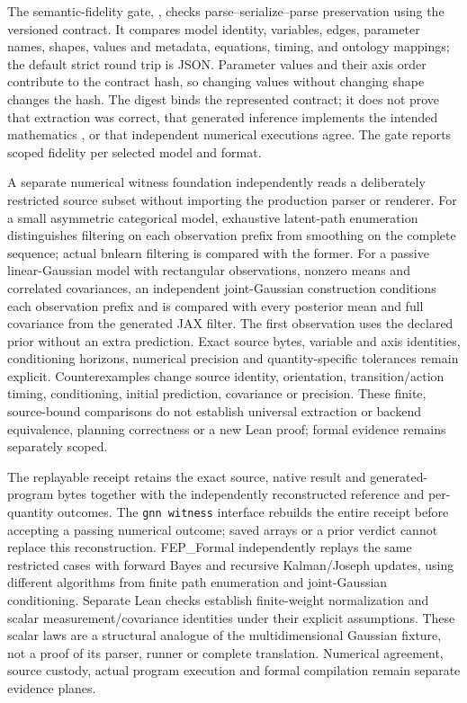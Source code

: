 \documentclass[
  english,
  9pt,
]{extarticle}
\begin{document}
The semantic-fidelity gate,
, checks
parse--serialize--parse preservation using the versioned
 contract. It compares model
identity, variables, edges, parameter names, shapes, values and
metadata, equations, timing, and ontology mappings; the default strict
round trip is JSON. Parameter values and their axis order contribute to
the contract hash, so changing values without changing shape changes the
hash. The digest binds the represented contract; it does not prove that
extraction was correct, that generated inference implements the intended
mathematics \citep{dacosta2020}, or that independent numerical
executions agree. The gate reports scoped fidelity per selected model
and format.

A separate numerical witness foundation independently reads a
deliberately restricted source subset without importing the production
parser or renderer. For a small asymmetric categorical model, exhaustive
latent-path enumeration distinguishes filtering on each observation
prefix from smoothing on the complete sequence; actual bnlearn filtering
is compared with the former. For a passive linear-Gaussian model with
rectangular observations, nonzero means and correlated covariances, an
independent joint-Gaussian construction conditions each observation
prefix and is compared with every posterior mean and full covariance
from the generated JAX filter. The first observation uses the declared
prior without an extra prediction. Exact source bytes, variable and axis
identities, conditioning horizons, numerical precision and
quantity-specific tolerances remain explicit. Counterexamples change
source identity, orientation, transition/action timing, conditioning,
initial prediction, covariance or precision. These finite, source-bound
comparisons do not establish universal extraction or backend
equivalence, planning correctness or a new Lean proof; formal evidence
remains separately scoped.

The replayable  receipt retains the
exact source, native result and generated-program bytes together with
the independently reconstructed reference and per-quantity outcomes. The
\texttt{gnn\ witness} interface rebuilds the entire receipt before
accepting a passing numerical outcome; saved arrays or a prior verdict
cannot replace this reconstruction. FEP\_Formal independently replays
the same restricted cases with forward Bayes and recursive Kalman/Joseph
updates, using different algorithms from finite path enumeration and
joint-Gaussian conditioning. Separate Lean checks establish
finite-weight normalization and scalar measurement/covariance identities
under their explicit assumptions. These scalar laws are a structural
analogue of the multidimensional Gaussian fixture, not a proof of its
parser, runner or complete translation. Numerical agreement, source
custody, actual program execution and formal compilation remain separate
evidence planes.
\end{document}
